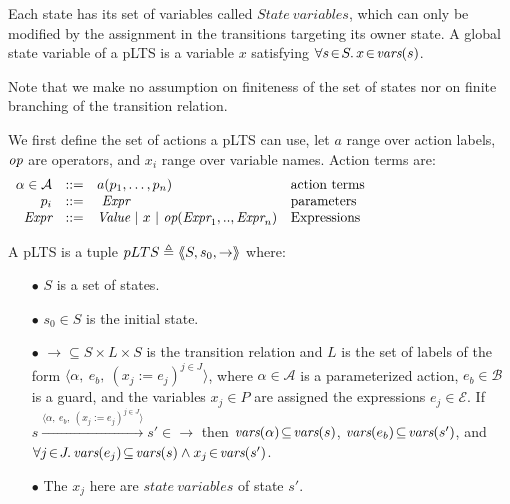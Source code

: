 \documentclass{lncs/llncs}
\newcommand{\QIN}[1]{\textcolor{airforceblue}{#1}}
\def\AlgE{\mathcal{E}}
\def\AlgA{\mathcal{A}}
\def\AlgB{\mathcal{B}}
\begin{document}
Each state has its set of variables called $State\ variables$, 
which can only be modified by the assignment in the transitions targeting its owner state. 
A global state variable of a pLTS is a variable $x$ satisfying $\forall s\!\in\! S .\, x\!\in\! \vars(s)$.

Note that we make no assumption on finiteness of the set of states nor
on finite branching of the transition relation.

We first define the set of actions a pLTS can use, let $a$
range over action labels, $\symb{op}$ are operators, and $x_i$ range over
variable names. Action terms are:
\[
\begin{array}[l]{rcl@{\quad}p{5.5cm}}
  \alpha\in\AlgA&::=&a(p_1,\ldots,p_n)&\text{action terms}\\
  p_i&::=& ~\symb{Expr}&\text{parameters}\\
  \symb{Expr}&::=& \symb{Value}~|~x~|~\symb{op}(\symb{Expr}_1,..,\symb{Expr}_n)&\text{Expressions}
\end{array}
\]


\begin{definition}[pLTS]
\label{pLTS}
A pLTS is a tuple
$pLTS\triangleq\langle\hspace{-0.58ex}\langle S,s_0, \to\rangle\hspace{-0.58ex}\rangle$ where:
\begin{itemize}
\item[$\bullet$]
$S$ is a set of states.
\item[$\bullet$]
$s_0 \in S$ is the initial state.
\item[$\bullet$] $\to \subseteq S \times L \times S$ is the transition relation and 
$L$ is the set of labels of the form
$\langle \alpha,~e_b,~(x_j\!:= {e}_j)^{j\in J}\rangle$,
where $\alpha \in\AlgA$ is a parameterized action, $e_b \in
\AlgB$ is a guard, and the variables $x_j\in P$
are assigned the expressions $e_j\in \AlgE$.
If 
$s \xrightarrow{\langle \alpha,~e_b,~(x_j\!:= {e}_j)^{j\in
		J}\rangle} s'\in \to $ then 
		$\vars(\alpha)\!\subseteq\! \vars(s)$, 
		$\vars(e_b)\!\subseteq\! \vars(s')$, and
		$\forall j\!\in\! J .\,\vars(e_j)\!\subseteq\! \vars(s)\land 
x_j\!\in\!\vars(s')$.
\item[$\bullet$]
The $x_j$ here are $state\ variables$ of state $s'$. 


\end{itemize}
\end{definition}
\end{document}
